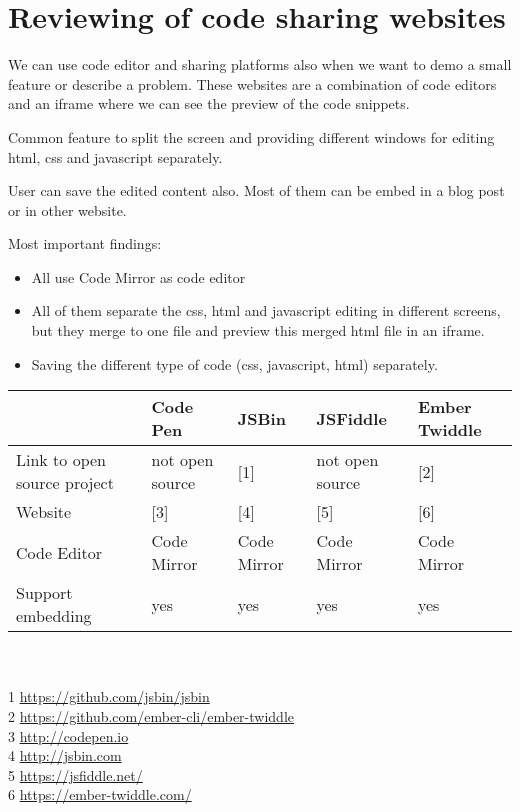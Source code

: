 \section{Reviewing of code sharing websites}

We can use code editor and sharing platforms also when we want to demo a small feature or describe a problem. These websites are a combination of code editors and an iframe where we can see the preview of the code snippets.

Common feature to split the screen and providing different windows for editing html, css and javascript separately.

User can save the edited content also. Most of them can be embed in a blog post or in other website.

Most important findings:
\begin{itemize}
\item All use Code Mirror as code editor
\item All of them separate the css, html and javascript editing in different screens, but they merge to one file and preview this merged html file in an iframe.
\item Saving the different type of code (css, javascript, html) separately.
\end{itemize}


\begin{tabular}{|l|l|l|l|l|}
\hline
& Code Pen & JSBin & JSFiddle & Ember Twiddle \\
\hline
Link to open source project & not open source & [1] & not open source & [2]  \\
\hline
Website & [3] & [4] & [5] & [6] \\
\hline
Code Editor & Code Mirror & Code Mirror & Code Mirror & Code Mirror \\
\hline
Support embedding & yes & yes & yes & yes \\
\hline
\end{tabular}\\

\\
1 \url{https://github.com/jsbin/jsbin} \\
2 \url{https://github.com/ember-cli/ember-twiddle} \\
3 \url{http://codepen.io} \\
4 \url{http://jsbin.com} \\
5 \url{https://jsfiddle.net/} \\
6 \url{https://ember-twiddle.com/} \\
